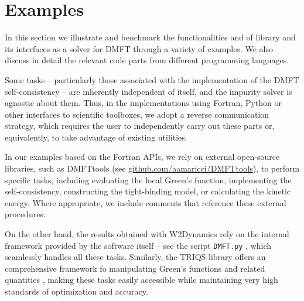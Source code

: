 \documentclass[edipack_sp.tex]{subfiles}
\begin{document}
\section{Examples}\label{SecExamples}
In this section we illustrate and benchmark the functionalities and of  \NAME
library and its interfaces as a solver for DMFT through a variety of examples. We also discuss in detail the relevant code parts from different programming languages. 

Some tasks -- particularly those associated with the implementation of the DMFT self-consistency -- are inherently independent of \NAME itself, and the impurity solver is agnostic about them. 
Thus, in the implementations using Fortran, Python or other \NAME interfaces to scientific toolboxes, we adopt a reverse communication strategy, which requires the user to independently carry out these parts or, equivalently, to take advantage of existing utilities. 

In our examples based on the Fortran APIs, we rely on external open-source libraries, such as DMFTtools (see \href{https://github.com/aamaricci/DMFTtools}{github.com/aamaricci/DMFTtools}), to perform specific tasks, including evaluating the local Green’s function, implementing the self-consistency, constructing the tight-binding model, or calculating the kinetic energy.
Where appropriate, we include comments that reference these external procedures.

On the other hand, the results obtained with W2Dynamics rely on the internal framework provided by the software itself -- see the script \texttt{DMFT.py} \cite{Wallerberger2019CPC}, which seamlessly handles all these tasks.
Similarly, the TRIQS library offers an comprehensive framework fo manipulating Green’s functions and related quantities \cite{Parcollet2015CPC}, making these tasks easily accessible while maintaining very high standards of optimization and accuracy.
\end{document}
